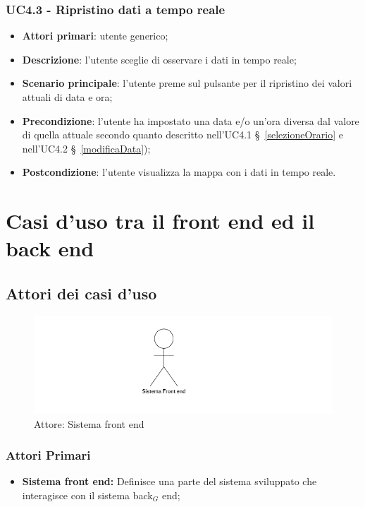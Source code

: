 \subsubsection{UC4.3 - Ripristino dati a tempo reale}\label{ripristinoTempoReale}
\begin{itemize}
	\item \textbf{Attori primari}: utente generico;
	\item \textbf{Descrizione}:  l’utente sceglie di osservare i dati in tempo reale;
	\item \textbf{Scenario principale}: l’utente preme sul pulsante per il ripristino dei valori attuali di data e ora;
	\item \textbf{Precondizione}: l’utente ha impostato una data e/o un’ora diversa dal valore di quella attuale secondo quanto descritto nell'UC4.1 \S~\ref{selezioneOrario} e nell'UC4.2 \S~\ref{modificaData});
	\item \textbf{Postcondizione}: l’utente visualizza la mappa con i dati in tempo reale.
\end{itemize}

\section{Casi d'uso tra il front end ed il back end}\label{ucFrontEndBackEnd}

\subsection{Attori dei casi d'uso} %
\begin{center}
	\begin{figure}[H]
		\includegraphics{../immagini/attori_casi/sistema_front_end.png}
		\caption{Attore: Sistema front end}
	\end{figure}
\end{center}
\subsubsection{Attori Primari}\label{FBattoriPrimari}
\begin{itemize}
	\item \textbf{Sistema front end:} Definisce una parte del sistema sviluppato che interagisce con il sistema back$_G$ end;
\end{itemize}


